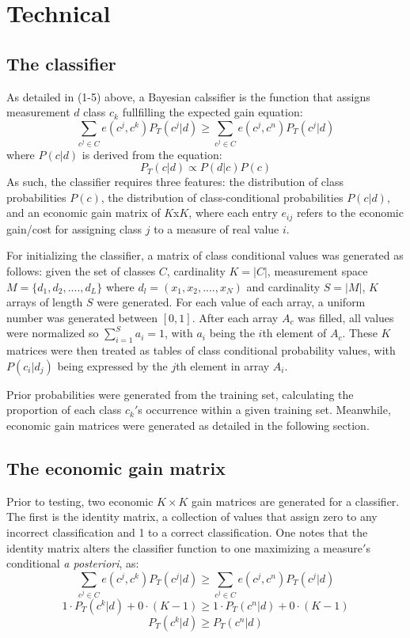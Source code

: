 \documentclass[10pt, conference]{IEEEtran}
\begin{document}
\section{Technical}
\subsection{The classifier}
As detailed in (1-5) above, a Bayesian calssifier is the function that assigns measurement $d$ class $c_k$ fullfilling the expected gain equation:
\begin{equation*}
\sum_{c^j \in C}{e(c^j, c^k)P_T(c^j|d)} \geq \sum_{c^j \in C}{e(c^j,c^n)P_T(c^j|d)}
\end{equation*}
where $P(c|d)$ is derived from the equation:
 \begin{equation*}
P_T(c|d) \propto P(d|c)P(c)
\end{equation*}
 As such, the classifier requires three features: the distribution of class probabilities $P(c)$, the distribution of class-conditional probabilities $P(c|d)$, and an economic gain matrix of $K$x$K$, where each entry $e_{ij}$ refers to the economic gain/cost for assigning class  $j$ to a measure of real value $i$. 
	
	For initializing the classifier, a matrix of class conditional values was generated as follows: given the set of classes $C$, cardinality $K=|C|$, measurement space $M= \{d_1,d_2,....,d_L\}$ where $d_l = (x_1,x_2,....,x_N)$ and cardinality $S=|M|$,  $K$ arrays of length $S$ were generated. For each value of each array, a uniform number was generated between $[0,1]$. After each array $A_c$ was filled, all values were normalized so $\sum_{i=1}^{S}a_i=1$, with $a_i$ being the $i$th element of $A_c$. These $K$ matrices were then treated as tables of class conditional probability values, with $P(c_i|d_j)$ being expressed by the $j$th element in array $A_i$. 
	
	Prior probabilities were generated from the training set, calculating the proportion of each class $c_k'$s occurrence within a given training set. Meanwhile, economic gain matrices were generated as detailed in the following section.
\subsection{The economic gain matrix}
	Prior to testing, two economic $K \times K$ gain matrices are generated for a classifier. The first is the identity matrix, a collection of values that assign zero to any incorrect classification and 1 to a correct classification. One notes that the identity matrix alters the classifier function to one maximizing a measure$'$s conditional \textit{a posteriori}, as:
\begin{equation*}
\sum_{c^j \in C}{e(c^j, c^k)P_T(c^j|d)} \geq \sum_{c^j \in C}{e(c^j,c^n)P_T(c^j|d)} 
\end{equation*}
\begin{equation*}
1 \cdot P_T(c^k|d) + 0 \cdot (K-1) \geq 1 \cdot P_T(c^n|d) + 0 \cdot (K-1)
\end{equation*}
\begin{equation}
P_T(c^k|d) \geq P_T(c^n|d)
\end{equation}
\end{document}
